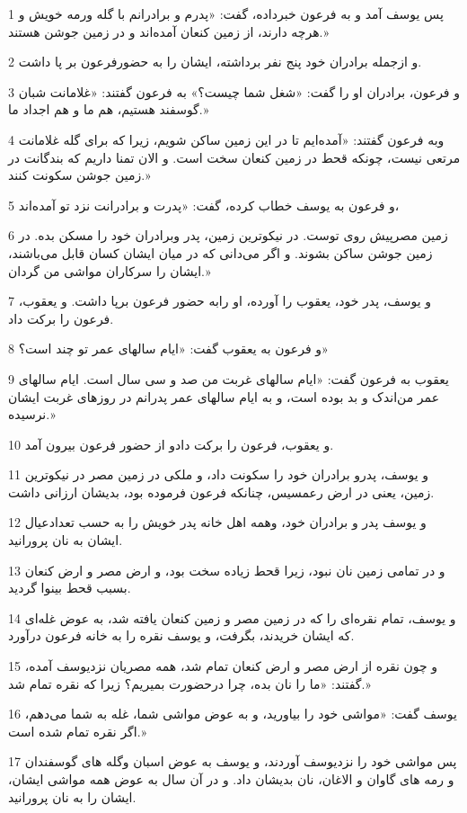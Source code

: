 \par 1 پس یوسف آمد و به فرعون خبرداده، گفت: «پدرم و برادرانم با گله ورمه خویش و هر‌چه دارند، از زمین کنعان آمده‌اند و در زمین جوشن هستند.»
\par 2 و از‌جمله برادران خود پنج نفر برداشته، ایشان را به حضورفرعون بر پا داشت.
\par 3 و فرعون، برادران او را گفت: «شغل شما چیست؟» به فرعون گفتند: «غلامانت شبان گوسفند هستیم، هم ما و هم اجداد ما.»
\par 4 وبه فرعون گفتند: «آمده‌ایم تا در این زمین ساکن شویم، زیرا که برای گله غلامانت مرتعی نیست، چونکه قحط در زمین کنعان سخت است. و الان تمنا داریم که بندگانت در زمین جوشن سکونت کنند.»
\par 5 و فرعون به یوسف خطاب کرده، گفت: «پدرت و برادرانت نزد تو آمده‌اند،
\par 6 زمین مصرپیش روی توست. در نیکوترین زمین، پدر وبرادران خود را مسکن بده. در زمین جوشن ساکن بشوند. و اگر می‌دانی که در میان ایشان کسان قابل می‌باشند، ایشان را سرکاران مواشی من گردان.»
\par 7 و یوسف، پدر خود، یعقوب را آورده، او رابه حضور فرعون برپا داشت. و یعقوب، فرعون را برکت داد.
\par 8 و فرعون به یعقوب گفت: «ایام سالهای عمر تو چند است؟»
\par 9 یعقوب به فرعون گفت: «ایام سالهای غربت من صد و سی سال است. ایام سالهای عمر من‌اندک و بد بوده است، و به ایام سالهای عمر پدرانم در روزهای غربت ایشان نرسیده.»
\par 10 و یعقوب، فرعون را برکت دادو از حضور فرعون بیرون آمد.
\par 11 و یوسف، پدرو برادران خود را سکونت داد، و ملکی در زمین مصر در نیکوترین زمین، یعنی در ارض رعمسیس، چنانکه فرعون فرموده بود، بدیشان ارزانی داشت.
\par 12 و یوسف پدر و برادران خود، وهمه اهل خانه پدر خویش را به حسب تعدادعیال ایشان به نان پرورانید.
\par 13 و در تمامی زمین نان نبود، زیرا قحط زیاده سخت بود، و ارض مصر و ارض کنعان بسبب قحط بینوا گردید.
\par 14 و یوسف، تمام نقره‌ای را که در زمین مصر و زمین کنعان یافته شد، به عوض غله‌ای که ایشان خریدند، بگرفت، و یوسف نقره را به خانه فرعون درآورد.
\par 15 و چون نقره از ارض مصر و ارض کنعان تمام شد، همه مصریان نزدیوسف آمده، گفتند: «ما را نان بده، چرا درحضورت بمیریم؟ زیرا که نقره تمام شد.»
\par 16 یوسف گفت: «مواشی خود را بیاورید، و به عوض مواشی شما، غله به شما می‌دهم، اگر نقره تمام شده است.»
\par 17 پس مواشی خود را نزدیوسف آوردند، و یوسف به عوض اسبان وگله های گوسفندان و رمه های گاوان و الاغان، نان بدیشان داد. و در آن سال به عوض همه مواشی ایشان، ایشان را به نان پرورانید.
